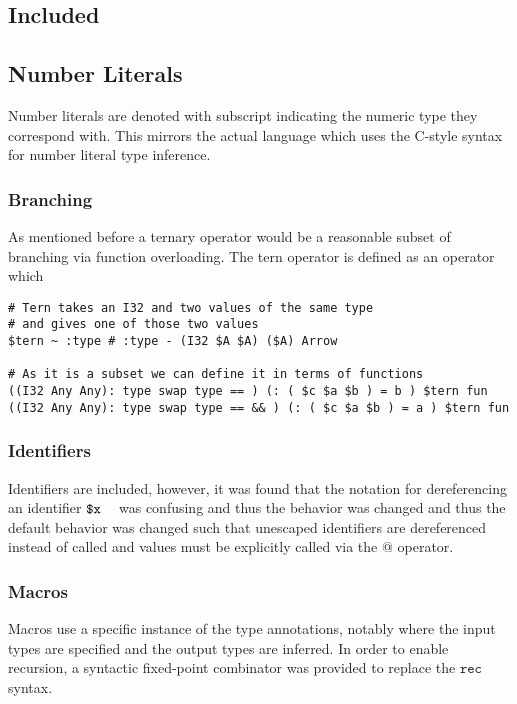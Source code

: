 \documentclass{article}
\begin{document}
\subsection{Included}

\subsection{Number Literals}
Number literals are denoted with subscript indicating the numeric type they correspond with.
This mirrors the actual language which uses the C-style syntax for number literal type inference.

\subsubsection{Branching}
As mentioned before a ternary operator would be a reasonable subset of branching via function overloading. The tern operator is defined as an operator which 

\begin{verbatim}
# Tern takes an I32 and two values of the same type
# and gives one of those two values
$tern ~ :type # :type - (I32 $A $A) ($A) Arrow

# As it is a subset we can define it in terms of functions
((I32 Any Any): type swap type == ) (: ( $c $a $b ) = b ) $tern fun
((I32 Any Any): type swap type == && ) (: ( $c $a $b ) = a ) $tern fun
\end{verbatim}

\subsubsection{Identifiers}
Identifiers are included, however, it was found that the notation for 
dereferencing an identifier $\texttt{\$x}~\texttt{~}$ was confusing and
thus the behavior was changed and thus the default behavior was
changed such that unescaped identifiers are dereferenced instead of 
called and values must be explicitly called via the $\texttt{@}$
operator.

\subsubsection{Macros}
Macros use a specific instance of the type annotations, notably where the
input types are specified and the output types are inferred. In order to 
enable recursion, a syntactic fixed-point combinator was provided to replace
the $\texttt{rec}$ syntax.
\end{document}
